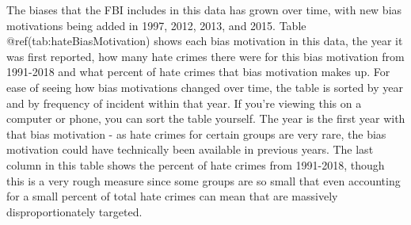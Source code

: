 \documentclass[
  12pt,
  openany]{book}
\begin{document}
The biases that the FBI includes in this data has grown over time, with new bias motivations being added in 1997, 2012, 2013, and 2015. Table @ref(tab:hateBiasMotivation) shows each bias motivation in this data, the year it was first reported, how many hate crimes there were for this bias motivation from 1991-2018 and what percent of hate crimes that bias motivation makes up. For ease of seeing how bias motivations changed over time, the table is sorted by year and by frequency of incident within that year. If you're viewing this on a computer or phone, you can sort the table yourself. The year is the first year with that bias motivation - as hate crimes for certain groups are very rare, the bias motivation could have technically been available in previous years. The last column in this table shows the percent of hate crimes from 1991-2018, though this is a very rough measure since some groups are so small that even accounting for a small percent of total hate crimes can mean that are massively disproportionately targeted.
\end{document}

